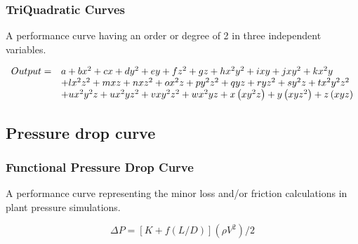 \subsubsection{TriQuadratic Curves}\label{triquadratic-curves}

A performance curve having an order or degree of 2 in three independent variables.

\begin{equation}
\begin{array}{ll}
Output =& a + bx^2 + cx + dy^2 + ey + fz^2 + gz + hx^2y^2 + ixy + jxy^2 + kx^2y \\
       &+ lx^2z^2 + mxz + nxz^2 + ox^2z + py^2z^2 + qyz + ryz^2 + sy^2z + tx^2y^2z^2 \\
       &+ ux^2y^2z + ux^2yz^2 + vxy^2z^2 + wx^2yz + x\left(xy^2z\right) + y\left(xyz^2\right) + z\left(xyz\right)
\end{array}
\end{equation}

\subsection{Pressure drop curve}\label{pressure-drop-curve}

\subsubsection{Functional Pressure Drop Curve}\label{functional-pressure-drop-curve}

A performance curve representing the minor loss and/or friction calculations in plant pressure simulations.

\begin{equation}
\Delta P = \left[ {K + f\left( {L/D} \right)} \right]\left( {\rho {V^2}} \right)/2
\end{equation}
